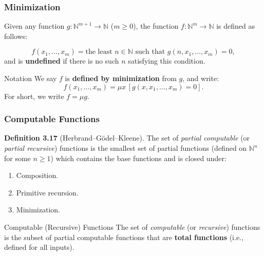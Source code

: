 \documentclass{beamer}
\begin{document}

\begin{frame}
  \frametitle{Minimization}

  \begin{definition}
    Given any function \( g: \mathbb{N}^{m+1} \to \mathbb{N} \) (\( m \geq 0 \)), the function \( f: \mathbb{N}^m \to \mathbb{N} \) is defined as follows:

    \[
      f(x_1, \dots, x_m) = \text{the least } n \in \mathbb{N} \text{ such that } g(n, x_1, \dots, x_m) = 0,
    \]
    and is \textbf{undefined} if there is no such \( n \) satisfying this condition.
  \end{definition}

  \begin{block}{Notation}
    We say \( f \) is \textbf{defined by minimization} from \( g \), and write:
    \[
      f(x_1, \dots, x_m) = \mu x \, [g(x, x_1, \dots, x_m) = 0].
    \]
    For short, we write \( f = \mu g \).
  \end{block}

\end{frame}

\begin{frame}
  \frametitle{Computable Functions}

  \begin{definition}
    \textbf{Definition 3.17} (Herbrand–Gödel–Kleene). The set of \textit{partial computable} (or \textit{partial recursive}) functions is the smallest set of partial functions (defined on \( \mathbb{N}^n \) for some \( n \geq 1 \)) which contains the base functions and is closed under:
    \begin{enumerate}
      \item Composition.
      \item Primitive recursion.
      \item Minimization.
    \end{enumerate}
  \end{definition}

  \begin{block}{Computable (Recursive) Functions}
    The set of \textit{computable} (or \textit{recursive}) functions is the subset of partial computable functions that are \textbf{total functions} (i.e., defined for all inputs).
  \end{block}
\end{frame}
\end{document}
